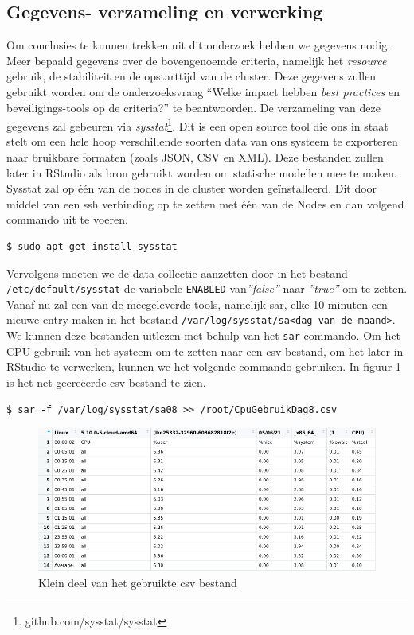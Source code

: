 \subsection{Gegevens- verzameling en verwerking} \label{ch:gegevens}
Om conclusies te kunnen trekken uit dit onderzoek hebben we gegevens nodig. Meer bepaald gegevens over de bovengenoemde criteria, namelijk het \textit{resource} gebruik, de stabiliteit en de opstarttijd van de cluster. Deze gegevens zullen gebruikt worden om de onderzoeksvraag ``Welke impact hebben \textit{best practices} en beveiligings-tools op de criteria?'' te beantwoorden. De verzameling van deze gegevens zal gebeuren via \textit{sysstat}\footnote{github.com/sysstat/sysstat}. Dit is een open source tool die ons in staat stelt om een hele hoop verschillende soorten data van ons systeem te exporteren naar bruikbare formaten (zoals JSON, CSV en XML). Deze bestanden zullen later in RStudio als bron gebruikt worden om statische modellen mee te maken. Sysstat zal op één van de nodes in de cluster worden geïnstalleerd. Dit door middel van een ssh verbinding op te zetten met één van de Nodes en dan volgend commando uit te voeren. 
\begin{verbatim} 
$ sudo apt-get install sysstat
\end{verbatim}

Vervolgens moeten we de data collectie aanzetten door in het bestand \verb|/etc/default/sysstat| de variabele \verb|ENABLED| van\textit{''false''} naar \textit{''true''} om te zetten. Vanaf nu zal een van de meegeleverde tools, namelijk sar, elke 10 minuten een nieuwe entry maken in het bestand \verb|/var/log/sysstat/sa<dag van de maand>|. We kunnen deze bestanden uitlezen met behulp van het \verb|sar| commando. Om het CPU gebruik van het systeem om te zetten naar een csv bestand, om het later in RStudio te verwerken, kunnen we het volgende commando gebruiken. In figuur \ref{fig:CPUDataPreview} is het net gecreëerde csv bestand te zien.

\begin{verbatim} 
$ sar -f /var/log/sysstat/sa08 >> /root/CpuGebruikDag8.csv
\end{verbatim}

\begin{figure}[h]
	\centering
	\includegraphics[width=\linewidth]{img/CPUDataPreview.png}
	\caption{Klein deel van het gebruikte csv bestand}
	\label{fig:CPUDataPreview}
\end{figure}

